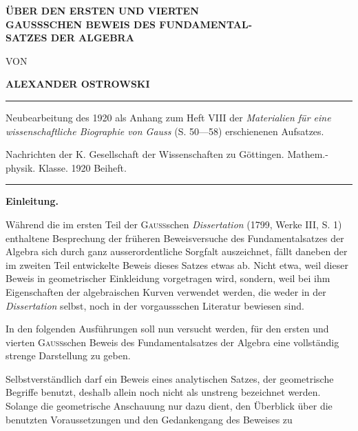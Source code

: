 \par\clearpage{}\NoSourceHead
{}
\begin{center}
{\Large\bfseries ÜBER DEN ERSTEN UND VIERTEN\\
GAUSSSCHEN BEWEIS DES FUNDAMENTAL-\\
SATZES DER ALGEBRA\par}
\vspace{2cm}
VON
\vspace{2cm}

{\large\bfseries ALEXANDER OSTROWSKI\par}
\vfill
\rule{\linewidth}{.4pt}\par
{\small Neubearbeitung des 1920 als Anhang zum Heft VIII der \textit{Materialien für eine wissenschaftliche Biographie von Gauss} (S. 50—58) erschienenen Aufsatzes.\par
Nachrichten der K. Gesellschaft der Wissenschaften zu Göttingen. Mathem.-physik. Klasse. 1920 Beiheft.\par}
\rule{\linewidth}{.4pt}
\end{center}
\clearpage{}\NoSourceHead\HistoricalFoot{}{1\textsuperscript{*}}
\renewcommand{\thefootnote}{\arabic{footnote})}\setcounter{footnote}{0}
\begin{center}\textbf{Einleitung.}\end{center}
\noindent\hspace*{\parindent}Während die im ersten Teil der \textsc{Gauss}schen \textit{Dissertation} (1799, Werke
III, S. 1) enthaltene Besprechung der früheren Beweisversuche des Fundamentalsatzes
der Algebra sich durch ganz ausserordentliche Sorgfalt auszeichnet, fällt
daneben der im zweiten Teil entwickelte Beweis dieses Satzes etwas ab. Nicht
etwa, weil dieser Beweis in geometrischer Einkleidung vorgetragen wird, sondern,
weil bei ihm Eigenschaften der algebraischen Kurven verwendet werden,
die weder in der \textit{Dissertation} selbst, noch in der vorgaussschen Literatur bewiesen
sind.
\par
In den folgenden Ausführungen soll nun versucht werden, für den ersten
und vierten \textsc{Gauss}schen Beweis des Fundamentalsatzes der Algebra eine vollständig
strenge Darstellung zu geben.
\par
Selbstverständlich darf ein Beweis eines analytischen Satzes, der geometrische
Begriffe benutzt, deshalb allein noch nicht als unstreng bezeichnet
werden. Solange die geometrische Anschauung nur dazu dient, den Überblick
über die benutzten Voraussetzungen und den Gedankengang des Beweises zu
